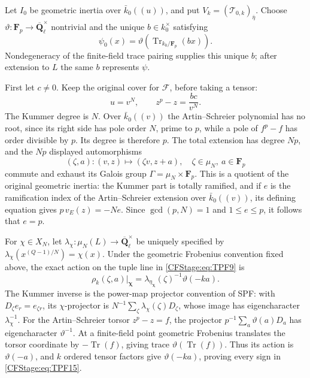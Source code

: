 Let \(I_0\) be geometric inertia over \(\bar k_0((u))\),
and put \(V_k=(\mathcal T_{0,k})_{\bar\eta}\).
Choose \(\vartheta:\mathbf F_p\to
\overline{\mathbf Q}_\ell^\times\) nontrivial and the unique
\(b\in k_0^\times\) satisfying
\[
 \psi_0(x)=\vartheta(\operatorname{Tr}_{k_0/\mathbf F_p}(bx)).
 \tag{TPF.12}\label{CFStage:eq:TPF12}
\]
Nondegeneracy of the finite-field trace pairing supplies
this unique \(b\); after extension to \(L\) the same \(b\)
represents \(\psi\).

First let \(c\ne0\). Keep the original cover for
\(\mathcal F\), before taking a tensor:
\[
 u=v^N,\qquad z^p-z=\frac{bc}{v^N}.
 \tag{TPF.13}\label{CFStage:eq:TPF13}
\]
The Kummer degree is \(N\). Over \(\bar k_0((v))\) the
Artin--Schreier polynomial has no root, since its right
side has pole order \(N\), prime to \(p\), while a pole
of \(f^p-f\) has order divisible by \(p\). Its degree is
therefore \(p\). The total extension has degree \(Np\),
and the \(Np\) displayed automorphisms
\[
 (\zeta,a):(v,z)\longmapsto(\zeta v,z+a),
 \quad \zeta\in\mu_N,\ a\in\mathbf F_p
 \tag{TPF.14}\label{CFStage:eq:TPF14}
\]
commute and exhaust its Galois group
\(\Gamma=\mu_N\times\mathbf F_p\). This is a quotient of
the original geometric inertia: the Kummer part is
totally ramified, and if \(e\) is the ramification index
of the Artin--Schreier extension over \(\bar k_0((v))\),
its defining equation gives \(p\,v_E(z)=-Ne\).
Since \(\gcd(p,N)=1\) and \(1\le e\le p\), it follows
that \(e=p\).

For \(\chi\in X_N\), let
\(\lambda_\chi:\mu_N(L)\to\overline{\mathbf Q}_\ell^\times\)
be uniquely specified by
\(\lambda_\chi(x^{(Q-1)/N})=\chi(x)\).
Under the geometric Frobenius convention fixed above, the
exact action on the tuple line in \eqref{CFStage:eq:TPF9} is
\[
 \rho_k(\zeta,a)\big|_{\boldsymbol\chi}
    =\lambda_{\eta_{\boldsymbol\chi}}(\zeta)^{-1}
                         \vartheta(-ka).
 \tag{TPF.15}\label{CFStage:eq:TPF15}
\]
The Kummer inverse is the power-map projector convention
of SPF: with \(D_\zeta e_r=e_{\zeta r}\), its
\(\chi\)-projector is
\(N^{-1}\sum_\zeta\lambda_\chi(\zeta)D_\zeta\), whose
image has eigencharacter \(\lambda_\chi^{-1}\).
For the Artin--Schreier torsor \(z^p-z=f\), the
projector \(p^{-1}\sum_a\vartheta(a)D_a\) has
eigencharacter \(\vartheta^{-1}\).
At a finite-field point geometric Frobenius translates
the torsor coordinate by
\(-\operatorname{Tr}(f)\), giving trace
\(\vartheta(\operatorname{Tr}(f))\).
Thus its action is \(\vartheta(-a)\), and \(k\) ordered
tensor factors give \(\vartheta(-ka)\), proving every
sign in \eqref{CFStage:eq:TPF15}.

